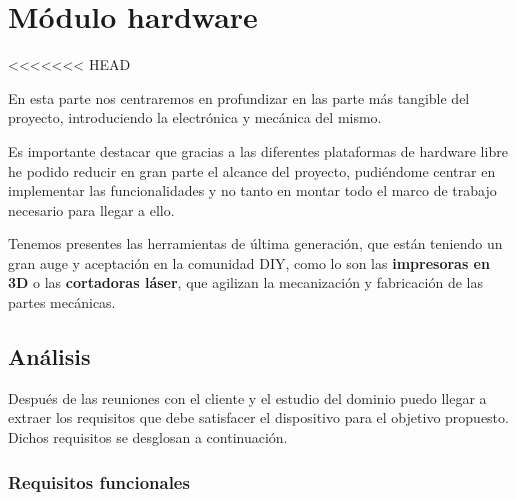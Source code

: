 \chapter{Módulo hardware}
<<<<<<< HEAD
\label{cap:hard}


En esta parte nos centraremos en profundizar en las parte más tangible del proyecto, introduciendo la electrónica y 
mecánica del mismo.

Es importante destacar que gracias a las  diferentes plataformas de hardware libre he podido reducir en gran parte el alcance del proyecto, pudiéndome  centrar en implementar las funcionalidades y no tanto en montar todo el marco de trabajo necesario para llegar a ello. 

Tenemos presentes las herramientas de última generación, que están teniendo un gran auge y aceptación 
en la comunidad DIY, como lo son las \textbf{impresoras en 3D} o las \textbf{cortadoras láser}, que agilizan la mecanización y fabricación de las partes mecánicas.


\section{Análisis}

Después de las reuniones con el cliente y el estudio del dominio puedo llegar a extraer los requisitos que debe satisfacer el dispositivo para el objetivo propuesto. Dichos requisitos se desglosan a continuación.

\subsection{Requisitos funcionales}

